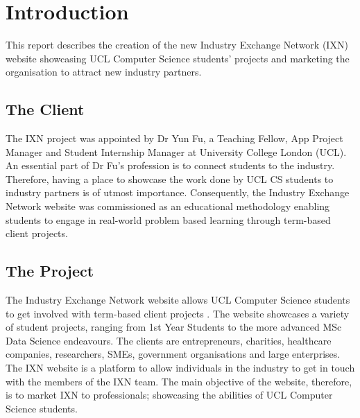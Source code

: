 \documentclass[fontsize=11pt]{extarticle}
\numberwithin{figure}{section} %
\numberwithin{table}{section}%
\begin{document}
\newpage

\clearpage
{}
\hypertarget{introduction}{%
\section{Introduction}\label{introduction}}

This report describes the creation of the new Industry Exchange Network
(IXN) website showcasing UCL Computer Science students' projects and
marketing the organisation to attract new industry partners.

\hypertarget{the-client}{%
\subsection{The Client}\label{the-client}}

The IXN project was appointed by Dr Yun Fu, a Teaching Fellow, App
Project Manager and Student Internship Manager at University College
London (UCL). An essential part of Dr Fu's profession is to connect
students to the industry. Therefore, having a place to showcase the work
done by UCL CS students to industry partners is of utmost importance.
Consequently, the Industry Exchange Network website was commissioned as
an educational methodology enabling students to engage in real-world
problem based learning through term-based client projects.

\hypertarget{the-project}{%
\subsection{The Project}\label{the-project}}

The Industry Exchange Network website allows UCL Computer Science
students to get involved with term-based client projects \cite{g1}. The
website showcases a variety of student projects, ranging from 1st Year
Students to the more advanced MSc Data Science endeavours. The clients
are entrepreneurs, charities, healthcare companies, researchers, SMEs,
government organisations and large enterprises. The IXN website is a
platform to allow individuals in the industry to get in touch with the
members of the IXN team. The main objective of the website, therefore,
is to market IXN to professionals; showcasing the abilities of UCL
Computer Science students.
\end{document}
